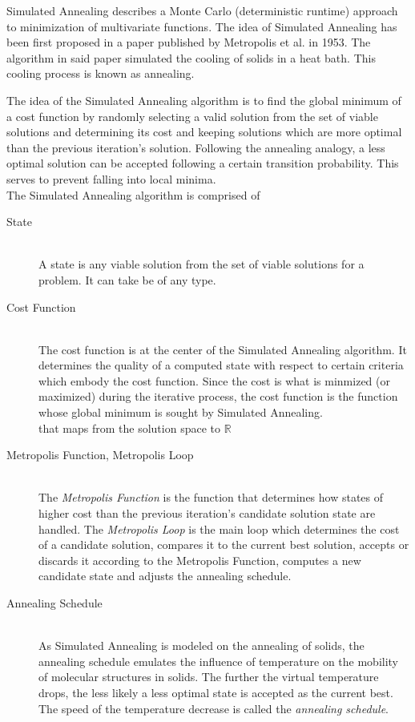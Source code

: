 \documentclass[12pt]{article}
\begin{document}
Simulated Annealing \cite{genpro} describes a Monte Carlo (deterministic runtime) approach to minimization of multivariate functions. The idea of Simulated Annealing has been first proposed in a paper published by Metropolis et al. in 1953. The algorithm in said paper simulated the cooling of solids in a heat bath. This cooling process is known as annealing.

The idea of the Simulated Annealing algorithm is to find the global minimum of a cost function by randomly selecting a valid solution from the set of viable solutions and determining its cost and keeping solutions which are more optimal than the previous iteration's solution. Following the annealing analogy, a less optimal solution can be accepted following a certain transition probability. This serves to prevent falling into local minima. \\ 
The Simulated Annealing algorithm is comprised of

\begin{description}
\item[State]~\\
\label{state}
A state is any viable solution from the set of viable solutions for a problem. It can take be of any type.
\item[Cost Function]~\\
\label{cofu}
The cost function is at the center of the Simulated Annealing algorithm. It determines the quality of a computed state with respect to certain criteria which embody the cost function. Since the cost is what is minmized (or maximized) during the iterative process, the cost function is the function whose global minimum is sought by Simulated Annealing. \\
that maps from the solution space to $\mathbb{R}$ 
\item[Metropolis Function, Metropolis Loop]~\\
\label{metro}
The \emph{Metropolis Function} is the function that determines how states of higher cost than the previous iteration's candidate solution state are handled. The \emph{Metropolis Loop} is the main loop which determines the cost of a candidate solution, compares it to the current best solution, accepts or discards it according to the Metropolis Function, computes a new candidate state and adjusts the annealing schedule.
\item[Annealing Schedule]~\\
\label{anneal}
As Simulated Annealing is modeled on the annealing of solids, the annealing schedule emulates the influence of temperature on the mobility of molecular structures in solids. The further the virtual temperature drops, the less likely a less optimal state is accepted as the current best. The speed of the temperature decrease is called the \emph{annealing schedule}.
\end{description} 
\end{document}
